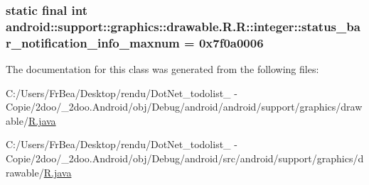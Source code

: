 \hypertarget{classandroid_1_1support_1_1graphics_1_1drawable_1_1_r_1_1integer_17ddf11ac5903d2c5866ebab649ded00}{
\subsubsection[{status\_\-bar\_\-notification\_\-info\_\-maxnum}]{\setlength{\rightskip}{0pt plus 5cm}static final int android::support::graphics::drawable.R.R::integer::status\_\-bar\_\-notification\_\-info\_\-maxnum = 0x7f0a0006}}
\label{classandroid_1_1support_1_1graphics_1_1drawable_1_1_r_1_1integer_17ddf11ac5903d2c5866ebab649ded00}




The documentation for this class was generated from the following files:\begin{CompactItemize}
\item 
C:/Users/FrBea/Desktop/rendu/DotNet\_\-todolist\_ - Copie/2doo/\_\-2doo.Android/obj/Debug/android/android/support/graphics/drawable/\hyperlink{android_2support_2graphics_2drawable_2_r_8java}{R.java}\item 
C:/Users/FrBea/Desktop/rendu/DotNet\_\-todolist\_ - Copie/2doo/\_\-2doo.Android/obj/Debug/android/src/android/support/graphics/drawable/\hyperlink{src_2android_2support_2graphics_2drawable_2_r_8java}{R.java}\end{CompactItemize}

